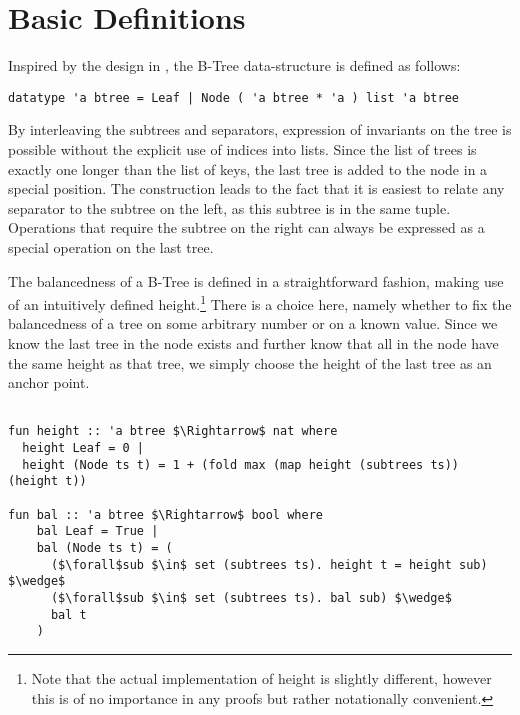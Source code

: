 \section{Basic Definitions}
\label{sec:basic-defs}


Inspired by the design in \parencite{DBLP:conf/popl/MalechaMSW10}, the B-Tree data-structure is defined as follows:

\begin{lstlisting}[mathescape=true, language=Isabelle,label=lst:btree-def]
datatype 'a btree = Leaf | Node ( 'a btree * 'a ) list 'a btree
\end{lstlisting}

By interleaving the subtrees and separators, expression of invariants
on the tree is possible without the explicit use of indices into lists.
Since the list of trees is exactly one longer than the list of keys,
the last tree is added to the node in a special position.
The construction leads to the fact that it is easiest to relate any separator
to the subtree on the left, as this subtree is in the same tuple.
Operations that require the subtree on the right can always be expressed as a special
operation on the last tree.

The balancedness of a B-Tree is defined in a straightforward fashion, making use
of an intuitively defined height.\footnote{
    Note that the actual implementation of height is slightly different,
    however this is of no importance in any proofs but rather notationally convenient.
}
There is a choice here, namely whether to fix the balancedness of a tree
on some arbitrary number or on a known value.
Since we know the last tree in the node exists and further
know that all in the node have the same height as that tree,
we simply choose the height of the last tree as an anchor point.

\begin{lstlisting}[mathescape=true, language=Isabelle]

fun height :: 'a btree $\Rightarrow$ nat where
  height Leaf = 0 |
  height (Node ts t) = 1 + (fold max (map height (subtrees ts)) (height t))

fun bal :: 'a btree $\Rightarrow$ bool where
    bal Leaf = True |
    bal (Node ts t) = (
      ($\forall$sub $\in$ set (subtrees ts). height t = height sub) $\wedge$
      ($\forall$sub $\in$ set (subtrees ts). bal sub) $\wedge$
      bal t
    )
\end{lstlisting}

